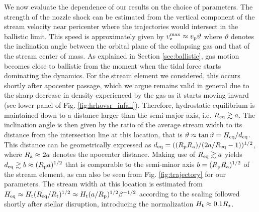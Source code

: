 \documentclass[a4paper,fleqn,usenatbib]{mnras}
\newcommand{\rstar}{R_{\star}}
\newcommand{\rp}{R_{\rm p}}
\newcommand{\rt}{R_{\rm t}}
\begin{document}
We now evaluate the dependence of our results on the choice of parameters. The strength of the nozzle shock can be estimated from the vertical component of the stream velocity near pericenter where the trajectories would intersect in the ballistic limit. This speed is approximately given by $v^{\rm max}_{\rm z} \approx  v_{\rm p} \vartheta$ where $\vartheta$ denotes the inclination angle between the orbital plane of the collapsing gas and that of the stream center of mass. As explained in Section \ref{sec:ballistic}, gas motion becomes close to ballistic from the moment when the tidal force starts dominating the dynamics. For the stream element we considered, this occurs shortly after apocenter passage, which we argue remains valid in general due to the sharp decrease in density experienced by the gas as it starts moving inward (see lower panel of Fig. \ref{fig:hrhovsr_infall}). Therefore, hydrostatic equilibrium is maintained down to a distance larger than the semi-major axis, i.e. $R_{\rm eq} \gtrsim a$. The inclination angle is then given by the ratio of the average stream width to its distance from the intersection line at this location, that is $\vartheta \approx \tan \vartheta = H_{\rm eq} / d_{\rm eq}$. This distance can be geometrically expressed as $d_{\rm eq} = ((\rp R_{\rm a})/(2a/R_{\rm eq} -1))^{1/2}$, where $R_{\rm a} \approx 2 a$ denotes the apocenter distance. Making use of $R_{\rm eq} \gtrsim a$ yields $d_{\rm eq} \gtrsim b \approx (\rp a)^{1/2}$ that is comparable to the semi-minor axis $b = (\rp  R_{\rm a})^{1/2}$ of the stream element, as can also be seen from Fig. \ref{fig:trajectory} for our parameters. The stream width at this location is estimated from $H_{\rm eq} \approx H_{\rm t} (R_{\rm eq} / \rt)^{1/2} \approx H_{\rm t} (a / \rp)^{1/2} \beta^{-1/2}$ according to the scaling followed shortly after stellar disruption, introducing the normalization $H_{\rm t} \approx 0.1 \rstar$.
\end{document}
